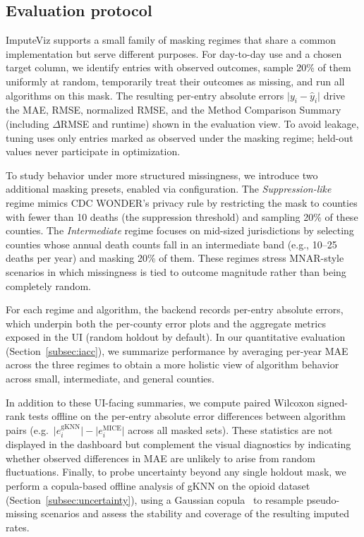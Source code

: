 \documentclass{egpubl}
\begin{document}
\vspace{-6pt}
\subsection{Evaluation protocol}
\label{subsec:eval_protocol}
ImputeViz supports a small family of masking regimes that share a common implementation but serve different purposes. For day-to-day use and a chosen target column, we identify entries with observed outcomes, sample 20\% of them uniformly at random, temporarily treat their outcomes as missing, and run all algorithms on this mask. The resulting per-entry absolute errors $\lvert y_i - \hat{y}_i \rvert$ drive the MAE, RMSE, normalized RMSE, and the Method Comparison Summary (including $\Delta$RMSE and runtime) shown in the evaluation view. To avoid leakage, tuning uses only entries marked as observed under the masking regime; held-out values never participate in optimization.

To study behavior under more structured missingness, we introduce two additional masking presets, enabled via configuration. The \emph{Suppression-like} regime mimics CDC WONDER’s privacy rule by restricting the mask to counties with fewer than 10 deaths (the suppression threshold) and sampling 20\% of these counties. The \emph{Intermediate} regime focuses on mid-sized jurisdictions by selecting counties whose annual death counts fall in an intermediate band (e.g., 10--25 deaths per year) and masking 20\% of them. These regimes stress MNAR-style scenarios in which missingness is tied to outcome magnitude rather than being completely random.

For each regime and algorithm, the backend records per-entry absolute errors, which underpin both the per-county error plots and the aggregate metrics exposed in the UI (random holdout by default). In our quantitative evaluation (Section~\ref{subsec:iacc}), we summarize performance by averaging per-year MAE across the three regimes to obtain a more holistic view of algorithm behavior across small, intermediate, and general counties.

In addition to these UI-facing summaries, we compute paired Wilcoxon signed-rank tests offline on the per-entry absolute error differences between algorithm pairs (e.g.\ $\lvert e_i^{\text{gKNN}}\rvert - \lvert e_i^{\text{MICE}}\rvert$ across all masked sets). These statistics are not displayed in the dashboard but complement the visual diagnostics by indicating whether observed differences in MAE are unlikely to arise from random fluctuations. Finally, to probe uncertainty beyond any single holdout mask, we perform a copula-based offline analysis of gKNN on the opioid dataset (Section~\ref{subsec:uncertainty}), using a Gaussian copula~\cite{nelsen2006introduction,joe2014dependence,hollenbach2021multiple} to resample pseudo-missing scenarios and assess the stability and coverage of the resulting imputed rates.
\end{document}
